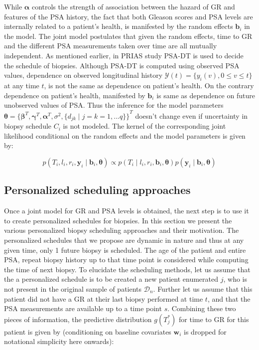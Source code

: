 While $\boldsymbol{\alpha}$ controls the strength of association between the hazard of GR and features of the PSA history, the fact that both Gleason scores and PSA levels are internally related to a patient's health, is manifested by the random effects $\boldsymbol{b}_i$ in the model. The joint model postulates that given the random effects, time to GR and the different PSA measurements taken over time are all mutually independent. As mentioned earlier, in PRIAS study PSA-DT is used to decide the schedule of biopsies. Although PSA-DT is computed using observed PSA values, dependence on observed longitudinal history $\mathcal{Y}(t) = \{y_i(v), 0\leq v \leq t\}$ at any time $t$, is not the same as dependence on patient's health. On the contrary dependence on patient's health, manifested by $\boldsymbol{b}_i$ is same as dependence on future unobserved values of PSA. Thus the inference for the model parameters $\boldsymbol{\theta} = {\{\boldsymbol{\beta}^T, \boldsymbol{\gamma}^T, \boldsymbol{\alpha}^T, \sigma^2, \{d_{jk} \mid j=k=1,...q\}\}}^T$ doesn't change even if uncertainty in biopsy schedule $C_i$ is not modeled. The kernel of the corresponding joint likelihood conditional on the random effects and the model parameters is given by:

\begin{equation*}
p(T_i, l_i, r_i, \boldsymbol{y}_i \mid \boldsymbol{b}_i, \boldsymbol{\theta}) \propto p(T_i \mid l_i, r_i, \boldsymbol{b}_i, \boldsymbol{\theta}) p(\boldsymbol{y}_i \mid \boldsymbol{b}_i, \boldsymbol{\theta})
\end{equation*}

\subsection{Personalized scheduling approaches}
\label{subsec : pers_sched_approaches}
Once a joint model for GR and PSA levels is obtained, the next step is to use it to create personalized schedules for biopsies. In this section we present the various personalized biopsy scheduling approaches and their motivation. The personalized schedules that we propose are dynamic in nature and thus at any given time, only 1 future biopsy is scheduled. The age of the patient and entire PSA, repeat biopsy history up to that time point is considered while computing the time of next biopsy. To elucidate the scheduling methods, let us assume that the a personalized schedule is to be created a new patient enumerated $j$, who is not present in the original sample of patients $\mathcal{D}_n$. Further let us assume that this patient did not have a GR at their last biopsy performed at time $t$, and that the PSA measurements are available up to a time point $s$. Combining these two pieces of information, the predictive distribution $g(T^*_j)$ for time to GR for this patient is given by (conditioning on baseline covariates $\boldsymbol{w}_i$ is dropped for notational simplicity here onwards):


